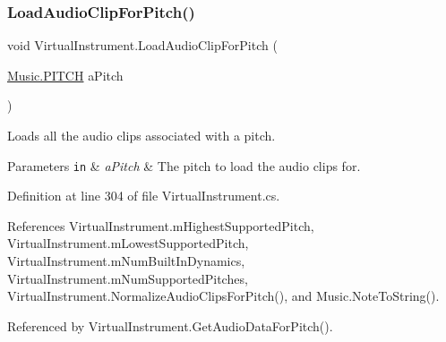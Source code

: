 \subsubsection{\texorpdfstring{Load\+Audio\+Clip\+For\+Pitch()}{LoadAudioClipForPitch()}}
{\footnotesize\ttfamily void Virtual\+Instrument.\+Load\+Audio\+Clip\+For\+Pitch (\begin{DoxyParamCaption}\item[{\hyperlink{group___music_enums_ga508f69b199ea518f935486c990edac1d}{Music.\+P\+I\+T\+CH}}]{a\+Pitch }\end{DoxyParamCaption})\hspace{0.3cm}{\ttfamily [protected]}}



Loads all the audio clips associated with a pitch. 


\begin{DoxyParams}[1]{Parameters}
\mbox{\tt in}  & {\em a\+Pitch} & The pitch to load the audio clips for. \\
\hline
\end{DoxyParams}


Definition at line 304 of file Virtual\+Instrument.\+cs.



References Virtual\+Instrument.\+m\+Highest\+Supported\+Pitch, Virtual\+Instrument.\+m\+Lowest\+Supported\+Pitch, Virtual\+Instrument.\+m\+Num\+Built\+In\+Dynamics, Virtual\+Instrument.\+m\+Num\+Supported\+Pitches, Virtual\+Instrument.\+Normalize\+Audio\+Clips\+For\+Pitch(), and Music.\+Note\+To\+String().



Referenced by Virtual\+Instrument.\+Get\+Audio\+Data\+For\+Pitch().


